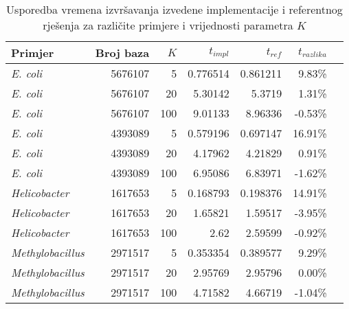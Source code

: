 \documentclass[times, utf8, seminar, numeric]{fer}
\begin{document}
\begin{table}[h]
	\centering
	\caption{Usporedba vremena izvršavanja izvedene implementacije i referentnog rješenja za različite primjere i vrijednosti parametra $K$}
	\label{tbl:results}
	
	\begin{tabular}{lrrrrrr}
		\hline
        Primjer & Broj baza & $K$ & $t_{impl}$ & $t_{ref}$ & $t_{razlika}$ \\ \hline
        \textit{E. coli} & 5676107 & 5 & 0.776514 & 0.861211 & 9.83\% \\
        \textit{E. coli} & 5676107 & 20 & 5.30142 & 5.3719 & 1.31\% \\
        \textit{E. coli} & 5676107 & 100 & 9.01133 & 8.96336 & -0.53\% \\ \hline
        \textit{E. coli} & 4393089 & 5 & 0.579196 & 0.697147 & 16.91\% \\
        \textit{E. coli} & 4393089 & 20 & 4.17962 & 4.21829 & 0.91\% \\
        \textit{E. coli} & 4393089 & 100 & 6.95086 & 6.83971 & -1.62\% \\ \hline
        \textit{Helicobacter} & 1617653 & 5 & 0.168793 & 0.198376 & 14.91\% \\
        \textit{Helicobacter} & 1617653 & 20 & 1.65821 & 1.59517 & -3.95\% \\
        \textit{Helicobacter} & 1617653 & 100 & 2.62 & 2.59599 & -0.92\% \\ \hline
        \textit{Methylobacillus} & 2971517 & 5 & 0.353354 & 0.389577 & 9.29\% \\
        \textit{Methylobacillus} & 2971517 & 20 & 2.95769 & 2.95796 & 0.00\% \\
        \textit{Methylobacillus} & 2971517 & 100 & 4.71582 & 4.66719 & -1.04\% \\
    \hline
	\end{tabular}
\end{table}
\end{document}
